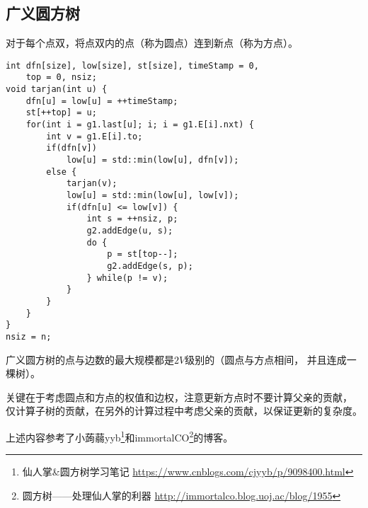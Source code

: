 \subsection{广义圆方树}
对于每个点双，将点双内的点（称为圆点）连到新点（称为方点）。
\begin{lstlisting}
int dfn[size], low[size], st[size], timeStamp = 0,
    top = 0, nsiz;
void tarjan(int u) {
    dfn[u] = low[u] = ++timeStamp;
    st[++top] = u;
    for(int i = g1.last[u]; i; i = g1.E[i].nxt) {
        int v = g1.E[i].to;
        if(dfn[v])
            low[u] = std::min(low[u], dfn[v]);
        else {
            tarjan(v);
            low[u] = std::min(low[u], low[v]);
            if(dfn[u] <= low[v]) {
                int s = ++nsiz, p;
                g2.addEdge(u, s);
                do {
                    p = st[top--];
                    g2.addEdge(s, p);
                } while(p != v);
            }
        }
    }
}
nsiz = n;
\end{lstlisting}
广义圆方树的点与边数的最大规模都是$2V$级别的（圆点与方点相间，
并且连成一棵树）。

关键在于考虑圆点和方点的权值和边权，注意更新方点时不要计算父亲的贡献，
仅计算子树的贡献，在另外的计算过程中考虑父亲的贡献，以保证更新的复杂度。

上述内容参考了小蒟蒻yyb\footnote{仙人掌\&圆方树学习笔记
    \url{https://www.cnblogs.com/cjyyb/p/9098400.html}
}和immortalCO\footnote{圆方树——处理仙人掌的利器
    \url{http://immortalco.blog.uoj.ac/blog/1955}
}的博客。
